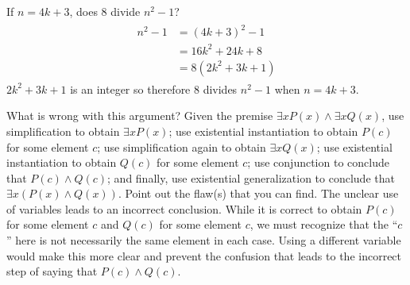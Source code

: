 \documentclass[paper=a4, fontsize=11pt]{jhwhw} %
\begin{document}
\problem{}
If $n=4k + 3$, does 8 divide $n^2-1$?
\solution
\begin{align}
\begin{split}
n^2 - 1 &= (4k + 3)^2 - 1\\
&= 16k^2 + 24k + 8\\
&= 8(2k^2 + 3k + 1)
\end{split}
\end{align}
$2k^2 + 3k + 1$ is an integer so therefore 8 divides $n^2-1$ when $n=4k+3$.

\problem{}
What is wrong with this argument? Given the premise $\exists x P(x) \land \exists x Q(x)$, use simplification to obtain $\exists x P(x)$; use existential instantiation to obtain $P(c)$ for some element $c$; use simplification again to obtain $\exists x Q(x)$; use existential instantiation to obtain $Q(c)$ for some element $c$; use conjunction to conclude that $P(c) \land Q(c)$; and finally, use existential generalization to conclude that $\exists x (P(x) \land Q(x))$. Point out the flaw(s) that you can find.
\solution
The unclear use of variables leads to an incorrect conclusion. While it is correct to obtain $P(c)$ for some element $c$ and $Q(c)$ for some element $c$, we must recognize that the ``$c$'' here is not necessarily the same element in each case. Using a different variable would make this more clear and prevent the confusion that leads to the incorrect step of saying that $P(c) \land Q(c)$.
\end{document}

